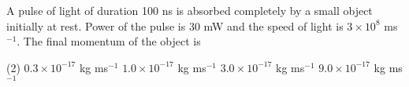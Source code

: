 
\item A pulse of light of duration 100 ns is absorbed completely by a small object initially at rest. Power of the pulse is 30 mW and the speed of light is \(3 \times 10^8\) ms\(^{-1}\). The final momentum of the object is
    \begin{tasks}(2)
        \task \(0.3 \times 10^{-17}\) kg ms\(^{-1}\)
        \task \(1.0 \times 10^{-17}\) kg ms\(^{-1}\)
        \task \(3.0 \times 10^{-17}\) kg ms\(^{-1}\)
        \task \(9.0 \times 10^{-17}\) kg ms\(^{-1}\)
    \end{tasks}
